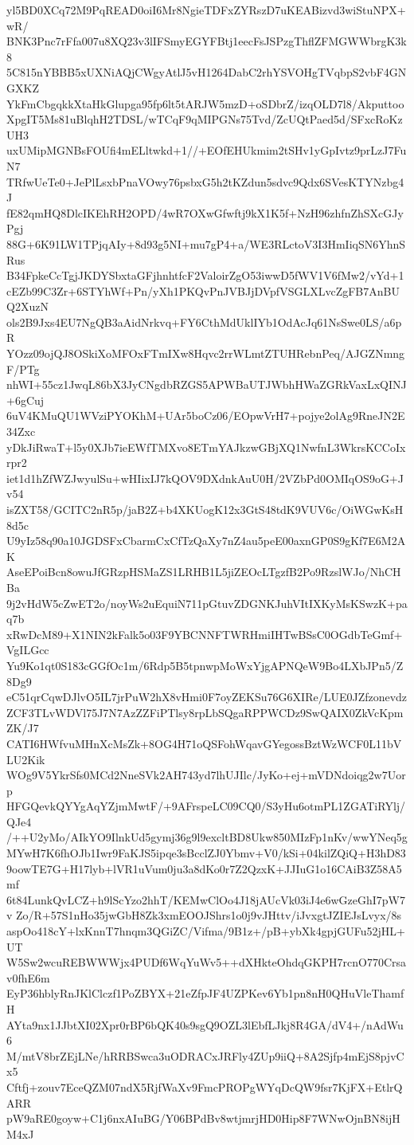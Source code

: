 yl5BD0XCq72M9PqREAD0oiI6Mr8NgieTDFxZYRszD7uKEABizvd3wiStuNPX+wR/
BNK3Pnc7rFfa007u8XQ23v3lIFSmyEGYFBtj1eecFsJSPzgThflZFMGWWbrgK3k8
5C815nYBBB5xUXNiAQjCWgyAtlJ5vH1264DabC2rhYSVOHgTVqbpS2vbF4GNGXKZ
YkFmCbgqkkXtaHkGlupga95fp6lt5tARJW5mzD+oSDbrZ/izqOLD7l8/Akputtoo
XpgIT5Ms81uBlqhH2TDSL/wTCqF9qMIPGNs75Tvd/ZcUQtPaed5d/SFxcRoKzUH3
uxUMipMGNBsFOUfi4mELltwkd+1//+EOfEHUkmim2tSHv1yGpIvtz9prLzJ7FuN7
TRfwUeTe0+JePlLsxbPnaVOwy76psbxG5h2tKZdun5sdvc9Qdx6SVesKTYNzbg4J
fE82qmHQ8DlcIKEhRH2OPD/4wR7OXwGfwftj9kX1K5f+NzH96zhfnZhSXcGJyPgj
88G+6K91LW1TPjqAIy+8d93g5NI+mu7gP4+a/WE3RLctoV3I3HmIiqSN6YhnSRus
B34FpkeCcTgjJKDYSbxtaGFjhnhtfcF2ValoirZgO53iwwD5fWV1V6fMw2/vYd+1
cEZb99C3Zr+6STYhWf+Pn/yXh1PKQvPnJVBJjDVpfVSGLXLvcZgFB7AnBUQ2XuzN
ols2B9Jxs4EU7NgQB3aAidNrkvq+FY6CthMdUklIYb1OdAcJq61NsSwe0LS/a6pR
YOzz09ojQJ8OSkiXoMFOxFTmIXw8Hqvc2rrWLmtZTUHRebnPeq/AJGZNmngF/PTg
nhWI+55cz1JwqL86bX3JyCNgdbRZGS5APWBaUTJWbhHWaZGRkVaxLxQINJ+6gCuj
6uV4KMuQU1WVziPYOKhM+UAr5boCz06/EOpwVrH7+pojye2olAg9RneJN2E34Zxc
yDkJiRwaT+l5y0XJb7ieEWfTMXvo8ETmYAJkzwGBjXQ1NwfnL3WkrsKCCoIxrpr2
iet1d1hZfWZJwyulSu+wHIixIJ7kQOV9DXdnkAuU0H/2VZbPd0OMIqOS9oG+Jv54
isZXT58/GCITC2nR5p/jaB2Z+b4XKUogK12x3GtS48tdK9VUV6c/OiWGwKsH8d5c
U9yIz58q90a10JGDSFxCbarmCxCfTzQaXy7nZ4au5peE00axnGP0S9gKf7E6M2AK
AseEPoiBcn8owuJfGRzpHSMaZS1LRHB1L5jiZEOcLTgzfB2Po9RzslWJo/NhCHBa
9j2vHdW5cZwET2o/noyWs2uEquiN711pGtuvZDGNKJuhVItIXKyMsKSwzK+paq7b
xRwDcM89+X1NIN2kFalk5o03F9YBCNNFTWRHmiIHTwBSsC0OGdbTeGmf+VgILGcc
Yu9Ko1qt0S183cGGfOc1m/6Rdp5B5tpnwpMoWxYjgAPNQeW9Bo4LXbJPn5/Z8Dg9
eC51qrCqwDJlvO5IL7jrPuW2hX8vHmi0F7oyZEKSu76G6XIRe/LUE0JZfzonevdz
ZCF3TLvWDVl75J7N7AzZZFiPTlsy8rpLbSQgaRPPWCDz9SwQAIX0ZkVcKpmZK/J7
CATI6HWfvuMHnXcMsZk+8OG4H71oQSFohWqavGYegossBztWzWCF0L11bVLU2Kik
WOg9V5YkrSfs0MCd2NneSVk2AH743yd7lhUJIlc/JyKo+ej+mVDNdoiqg2w7Uorp
HFGQevkQYYgAqYZjmMwtF/+9AFrspeLC09CQ0/S3yHu6otmPL1ZGATiRYlj/QJe4
/++U2yMo/AIkYO9IlnkUd5gymj36g9l9excltBD8Ukw850MIzFp1nKv/wwYNeq5g
MYwH7K6fhOJb1Iwr9FaKJS5ipqe3sBcclZJ0Ybmv+V0/kSi+04kilZQiQ+H3hD83
9oowTE7G+H17lyb+lVR1uVum0ju3a8dKo0r7Z2QzxK+JJIuG1o16CAiB3Z58A5mf
6t84LunkQvLCZ+h9lScYzo2hhT/KEMwClOo4J18jAUcVk03iJ4e6wGzeGhI7pW7v
Zo/R+57S1nHo35jwGbH8Zk3xmEOOJShrs1o0j9vJHttv/iJvxgtJZIEJsLvyx/8s
aspOo418cY+lxKnnT7hnqm3QGiZC/Vifma/9B1z+/pB+ybXk4gpjGUFu52jHL+UT
W5Sw2wcuREBWWWjx4PUDf6WqYuWv5++dXHkteOhdqGKPH7rcnO770Crsav0fhE6m
EyP36hblyRnJKlClczf1PoZBYX+21eZfpJF4UZPKev6Yb1pn8nH0QHuVleThamfH
AYta9nx1JJbtXI02Xpr0rBP6bQK40s9sgQ9OZL3lEbfLJkj8R4GA/dV4+/nAdWu6
M/mtV8brZEjLNe/hRRBSwca3uODRACxJRFly4ZUp9iiQ+8A2Sjfp4mEjS8pjvCx5
Cftfj+zouv7EceQZM07ndX5RjfWaXv9FmcPROPgWYqDcQW9fsr7KjFX+EtlrQARR
pW9aRE0goyw+C1j6nxAIuBG/Y06BPdBv8wtjmrjHD0Hip8F7WNwOjnBN8ijHM4xJ
